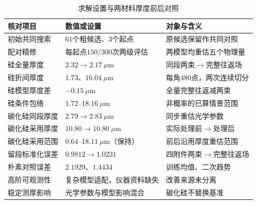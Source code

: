 \begingroup
\renewcommand{\baselinestretch}{1.05}
\footnotesize
\setlength{\LTpre}{2pt}
\setlength{\LTpost}{2pt}
\renewcommand{\arraystretch}{1.02}
\begin{longtable}{>{\centering\arraybackslash}p{} >{\centering\arraybackslash}p{} >{\centering\arraybackslash}p{}}
\caption{求解设置与两材料厚度前后对照}\label{tab:08}\\
\hline
核对项目 & 数值或设置 & 对象与含义\\
\hline
初始共同搜索 & $61$个粗候选、$3$个起点 & 原候选保留作共同对照\\
配对精修 & 每起点$150/300$次两级评估 & 两模型均重估五个物理量\\
硅全量厚度 & $2.32\rightarrow2.17\ \mu\mathrm{m}$ & 同段两束$\rightarrow$完整往返场\\
硅折间厚度 & $1.73$、$16.04\ \mu\mathrm{m}$ & 每角$480$点，两次连续切分\\
硅模型厚度差 & $-0.15\ \mu\mathrm{m}$ & 全量完整往返减两束\\
硅条件包络 & $1.72$--$18.16\ \mu\mathrm{m}$ & 非概率的已算情景范围\\
碳化硅同段厚度 & $2.79\rightarrow2.83\ \mu\mathrm{m}$ & 同步重估光学参数\\
碳化硅采用厚度 & $10.80\rightarrow10.80\ \mu\mathrm{m}$ & 实际处理前$\rightarrow$处理后\\
碳化硅采用范围 & $0.64$--$18.11\ \mu\mathrm{m}$（保持） & 前后沿用厚度重估范围\\
留段标准化误差 & $0.9812\rightarrow1.0231$ & 四附件两束$\rightarrow$完整往返场\\
朴素对照误差 & $2.1929$、$1.4434$ & 训练均值、二次趋势\\
高阶可观测性 & 复杂模型适配，仪器资料缺失 & 改善来源未分离\\
稳定测厚影响 & 光学参数与模型影响混合 & 碳化硅不替换基准\\
\hline
\end{longtable}
